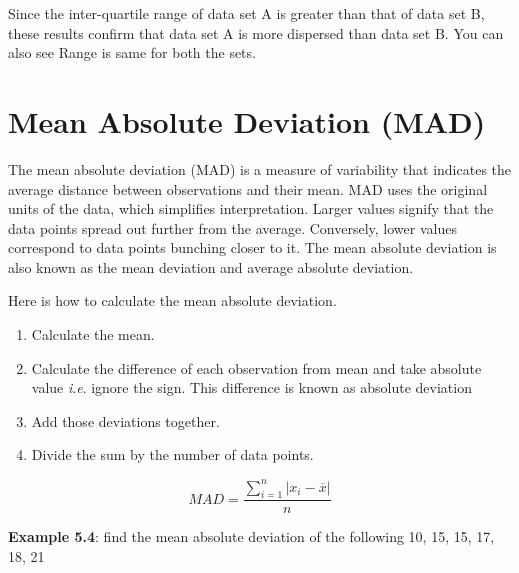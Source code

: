 \documentclass[
]{book}
\begin{document}
Since the inter-quartile range of data set A is greater than that of
data set B, these results confirm that data set A is more dispersed than
data set B. You can also see Range is same for both the sets.

\hypertarget{mean-absolute-deviation-mad}{%
\section{Mean Absolute Deviation (MAD)}\label{mean-absolute-deviation-mad}}

The mean absolute deviation (MAD) is a measure of variability that
indicates the average distance between observations and their mean. MAD
uses the original units of the data, which simplifies interpretation.
Larger values signify that the data points spread out further from the
average. Conversely, lower values correspond to data points bunching
closer to it. The mean absolute deviation is also known as the mean
deviation and average absolute deviation.

Here is how to calculate the mean absolute deviation.

\begin{enumerate}
\def\labelenumi{\arabic{enumi}.}
\item
  Calculate the mean.
\item
  Calculate the difference of each observation from mean and take
  absolute value \emph{i}.\emph{e}. ignore the sign. This difference is known as
  absolute deviation
\item
  Add those deviations together.
\item
  Divide the sum by the number of data points.
\end{enumerate}

\[MAD = \frac{\sum_{i = 1}^{n}\left| x_{i} - \overline{x} \right|}{n}\]

\textbf{Example 5.4}: find the mean absolute deviation of the following 10,
15, 15, 17, 18, 21
\end{document}
